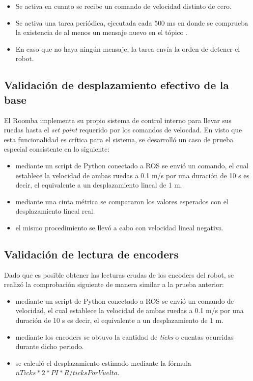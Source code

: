 \begin{itemize}
    \item Se activa en cuanto se recibe un comando de velocidad distinto de cero.
    \item Se activa una tarea periódica, ejecutada cada 500 ms en donde se comprueba la existencia de al menos un mensaje nuevo en el tópico .
    \item En caso que no haya ningún mensaje, la tarea envía la orden de detener el robot.
\end{itemize}

\subsection{Validación de desplazamiento efectivo de la base}

El Roomba implementa su propio sistema de control interno para llevar sus ruedas hasta el \textit{set point} requerido por los comandos de velocdad. En visto que esta funcionalidad es crítica para el sistema, se desarrolló un caso de prueba especial consistente en lo siguiente:

\begin{itemize}
    \item mediante un script de Python conectado a ROS se envió un comando, el cual establece la velocidad de ambas ruedas a 0.1 m/s por una duración de 10 s es decir, el equivalente a un desplazamiento lineal de 1 m.
    \item mediante una cinta métrica se compararon los valores esperados con el desplazamiento lineal real.
    \item el mismo procedimiento se llevó a cabo con velocidad lineal negativa.
\end{itemize}

\subsection{Validación de lectura de encoders}

Dado que es posible obtener las lecturas crudas de los encoders del robot, se realizó la comprobación siguiente de manera similar a la prueba anterior:

\begin{itemize}
    \item mediante un script de Python conectado a ROS se envió un comando de velocidad, el cual establece la velocidad de ambas ruedas a 0.1 m/s por una duración de 10 s es decir, el equivalente a un desplazamiento de 1 m.
    \item mediante los encoders se obtuvo la cantidad de \textit{ticks} o cuentas ocurridas durante dicho periodo.
    \item se calculó el desplazamiento estimado mediante la fórmula $nTicks * 2 * PI * R / ticksPorVuelta$.
\end{itemize}

